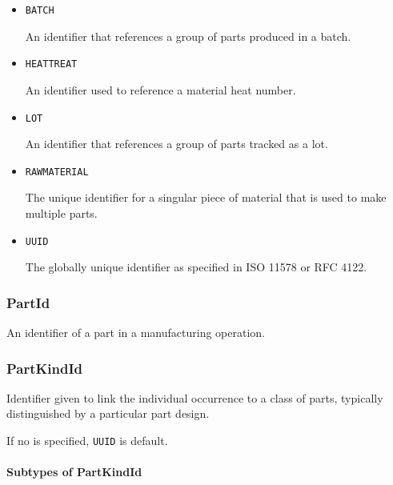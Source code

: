\begin{itemize}

\item \texttt{BATCH}


An identifier that references a group of parts produced in a batch.

\item \texttt{HEAT\textunderscore TREAT}


An identifier used to reference a material heat number.

\item \texttt{LOT}


An identifier that references a group of parts tracked as a lot.


\item \texttt{RAW\textunderscore MATERIAL}


The unique identifier for a singular piece of material that is used to make multiple parts.


\item \texttt{UUID}


The globally unique identifier as specified in ISO 11578 or RFC 4122.


\end{itemize}








\subsubsection{PartId}
\label{sec:PartId}



An identifier of a part in a manufacturing operation.



\subsubsection{PartKindId}
\label{sec:PartKindId}



Identifier given to link the individual occurrence to a class of parts, typically distinguished by a particular part design. 

If no  is specified, \texttt{UUID} is default.



\paragraph{Subtypes of PartKindId}\mbox{}
\label{sec:Subtypes of PartKindId}

